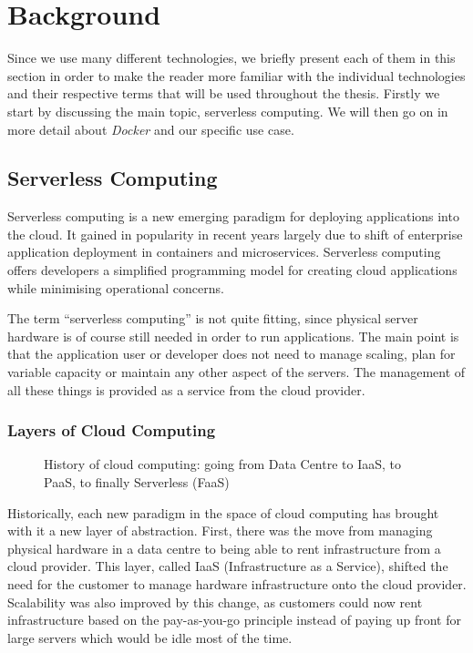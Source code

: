 \chapter{Background}
\label{sec:background}

Since we use many different technologies, we briefly present each of them in this section in order
to make the reader more familiar with the individual technologies and their respective terms that
will be used throughout the thesis. Firstly we start by discussing the main topic,
serverless computing. We will then go on in more detail about \textit{Docker} and our
specific use case.

\section{Serverless Computing}

Serverless computing is a new emerging paradigm for deploying applications into the cloud. It gained
in popularity in recent years largely due to shift of enterprise application deployment in
containers and microservices. Serverless computing offers developers a simplified
programming model for creating cloud applications while minimising operational concerns.
\cite{servprog}

The term “serverless computing” is not quite fitting, since physical server hardware is of course
still needed in order to run applications. The main point is that the application user or developer
does not need to manage scaling, plan for variable capacity or maintain any other aspect of the
servers. The management of all these things is provided as a service from the cloud provider.
\cite{wikiservcomp}

\subsection{Layers of Cloud Computing}

\begin{figure}[H]
  \centering
  \caption{History of cloud computing: going from Data Centre to IaaS, to PaaS, to finally
  Serverless (FaaS) \cite{layercloudcomp}}
\end{figure}

Historically, each new paradigm in the space of cloud computing has brought with it a new layer of
abstraction. First, there was the move from managing physical hardware in a data centre to being
able to rent infrastructure from a cloud provider. This layer, called IaaS (Infrastructure as a
Service), shifted the need for the customer to manage hardware infrastructure onto the cloud
provider. Scalability was also improved by this change, as customers could now rent infrastructure based on
the pay-as-you-go principle instead of paying up front for large servers which would be idle most of
the time.


